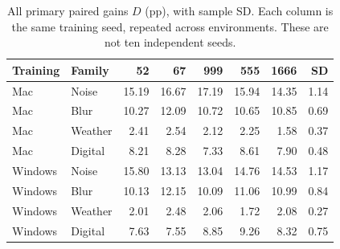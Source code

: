 \begin{table}[!htbp]
\centering
\small
\setlength{\tabcolsep}{5pt}
\caption{All primary paired gains $D$ (pp), with sample SD. Each column is the same training seed, repeated across environments. These are not ten independent seeds.}
\label{tab:seeds}
\begin{tabular}{llrrrrrr}
\toprule
Training & Family & 52 & 67 & 999 & 555 & 1666 & SD \\
\midrule
Mac & Noise & 15.19 & 16.67 & 17.19 & 15.94 & 14.35 & 1.14 \\
Mac & Blur & 10.27 & 12.09 & 10.72 & 10.65 & 10.85 & 0.69 \\
Mac & Weather & 2.41 & 2.54 & 2.12 & 2.25 & 1.58 & 0.37 \\
Mac & Digital & 8.21 & 8.28 & 7.33 & 8.61 & 7.90 & 0.48 \\
Windows & Noise & 15.80 & 13.13 & 13.04 & 14.76 & 14.53 & 1.17 \\
Windows & Blur & 10.13 & 12.15 & 10.09 & 11.06 & 10.99 & 0.84 \\
Windows & Weather & 2.01 & 2.48 & 2.06 & 1.72 & 2.08 & 0.27 \\
Windows & Digital & 7.63 & 7.55 & 8.85 & 9.26 & 8.32 & 0.75 \\
\bottomrule
\end{tabular}
\end{table}
